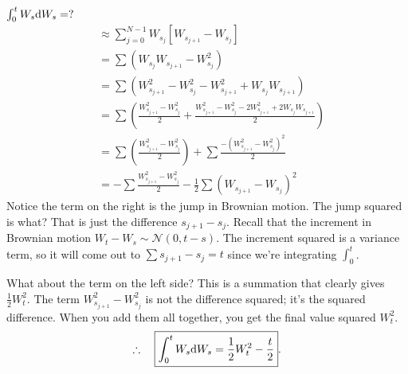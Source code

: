 \begin{example}
$\int_0^t W_s \text{d} W_s = ?$
\begin{align*}
&\approx \sum_{j=0}^{N-1} W_{s_j} [W_{s_{j+1}} - W_{s_j}] \\
&= \sum ( W_{s_j}W_{s_{j+1}} - W_{s_j}^2) \\
&= \sum (W_{s_{j+1}}^2 - W_{s_j}^2 
	- W_{s_{j+1}}^2 + W_{s_j} W_{s_{j+1}})  \tag{add 0} \\
&= \sum \left(  \frac{ W_{s_{j+1}}^2 - W_{s_j}^2 }{ 2 } 
	+ \frac{ W_{s_{j+1}}^2 - W_{s_j}^2 
		- 2W_{s_{j+1}}^2 + 2 W_{s_j} W_{s_{j+1}} }
		{ 2 }
	\right) \\
&= \sum \left(  \frac{ W_{s_{j+1}}^2 - W_{s_j}^2 }{ 2 } \right)
	+  \sum \frac{ - (W_{s_{j+1}}^2 - W_{s_j}^2)^2 } { 2 } \\
&= - \sum \frac{ W_{s_{j+1}}^2 - W_{s_j}^2 }{ 2 } 
	- \frac{1}{2} \sum (W_{s_{j+1}} - W_{s_j})^2
\end{align*}
Notice the term on the right is the jump in Brownian motion. The jump squared is what? That is just the difference $s_{j+1} - s_j$. Recall that the increment in Brownian motion $W_t - W_s\sim \mathcal{N}(0, t-s)$. The increment squared is a variance term, so it will come out to $\sum s_{j+1} - s_j = t$ since we're integrating $\int_0^t$. 

What about the term on the left side? This is a summation that clearly gives $\frac{1}{2} W_t^2.$ The term $ W_{s_{j+1}}^2 - W_{s_j}^2 $ is not the difference squared; it's the squared difference. When you add them all together, you get the final value squared $W_t^2$. 
\[ \therefore\quad 
	\boxed{ \int_0^t W_s \text{d} W_s 
	= \frac{1}{2} W_t^2 - \frac{t}{2} }. \]
\end{example}

